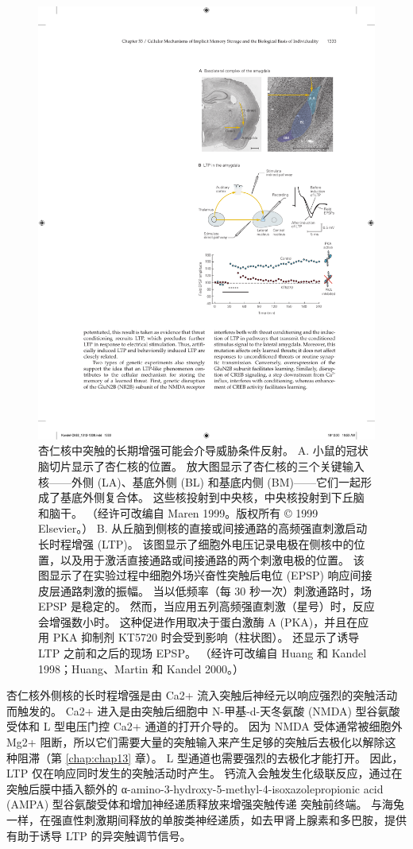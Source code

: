 \begin{figure}[htbp]
	\centering
	\includegraphics[width=0.6\linewidth]{chap53/fig_53_15}
	\caption{杏仁核中突触的长期增强可能会介导威胁条件反射。 A. 小鼠的冠状脑切片显示了杏仁核的位置。 放大图显示了杏仁核的三个关键输入核——外侧 (LA)、基底外侧 (BL) 和基底内侧 (BM)——它们一起形成了基底外侧复合体。 这些核投射到中央核，中央核投射到下丘脑和脑干。 （经许可改编自 Maren 1999。版权所有 © 1999 Elsevier。） B. 从丘脑到侧核的直接或间接通路的高频强直刺激启动长时程增强 (LTP)。 该图显示了细胞外电压记录电极在侧核中的位置，以及用于激活直接通路或间接通路的两个刺激电极的位置。 该图显示了在实验过程中细胞外场兴奋性突触后电位 (EPSP) 响应间接皮层通路刺激的振幅。 当以低频率（每 30 秒一次）刺激通路时，场 EPSP 是稳定的。 然而，当应用五列高频强直刺激（星号）时，反应会增强数小时。 这种促进作用取决于蛋白激酶 A (PKA)，并且在应用 PKA 抑制剂 KT5720 时会受到影响（柱状图）。 还显示了诱导 LTP 之前和之后的现场 EPSP。 （经许可改编自 Huang 和 Kandel 1998；Huang、Martin 和 Kandel 2000。）}
	\label{fig:53_15}
\end{figure}

杏仁核外侧核的长时程增强是由 Ca2+ 流入突触后神经元以响应强烈的突触活动而触发的。 Ca2+ 进入是由突触后细胞中 N-甲基-d-天冬氨酸 (NMDA) 型谷氨酸受体和 L 型电压门控 Ca2+ 通道的打开介导的。 因为 NMDA 受体通常被细胞外 Mg2+ 阻断，所以它们需要大量的突触输入来产生足够的突触后去极化以解除这种阻滞（第 \ref{chap:chap13} 章）。 L 型通道也需要强烈的去极化才能打开。 因此，LTP 仅在响应同时发生的突触活动时产生。 钙流入会触发生化级联反应，通过在突触后膜中插入额外的 α-amino-3-hydroxy-5-methyl-4-isoxazolepropionic acid (AMPA) 型谷氨酸受体和增加神经递质释放来增强突触传递 突触前终端。 与海兔一样，在强直性刺激期间释放的单胺类神经递质，如去甲肾上腺素和多巴胺，提供有助于诱导 LTP 的异突触调节信号。

